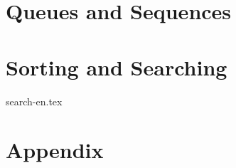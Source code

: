 \documentclass[a4paper,twoside]{book} %
\begin{document}





\part{Queues and Sequences}




\part{Sorting and Searching}


{search-en.tex}

\part{Appendix}
\appendix
\noappendicestocpagenum
\addappheadtotoc





\printindex
\end{document}
